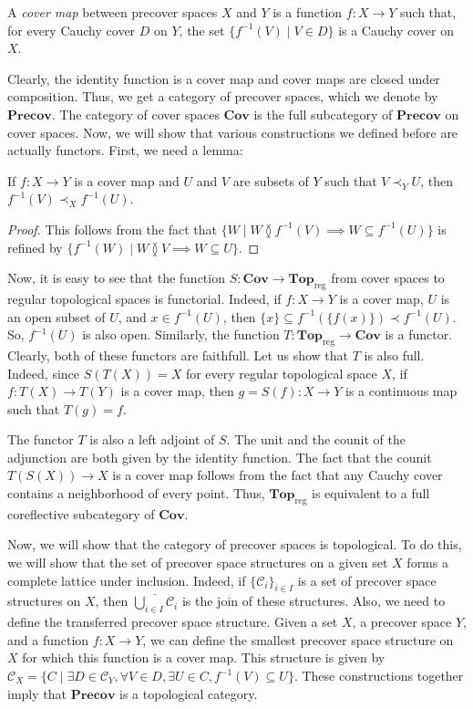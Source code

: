 \documentclass[reqno]{amsart}
\theoremstyle{definition}
\theoremstyle{remark}
\numberwithin{figure}{section}
\newcommand{\overlap}[2]{#1 \between #2}
\newcommand{\rb}{\prec}
\newcommand{\cat}[1]{\mathbf{#1}}
\begin{document}
\begin{defn}
A \emph{cover map} between precover spaces $X$ and $Y$ is a function $f : X \to Y$ such that, for every Cauchy cover $D$ on $Y$, the set $\{ f^{-1}(V) \mid V \in D \}$ is a Cauchy cover on $X$.
\end{defn}

Clearly, the identity function is a cover map and cover maps are closed under composition.
Thus, we get a category of precover spaces, which we denote by $\cat{Precov}$.
The category of cover spaces $\cat{Cov}$ is the full subcategory of $\cat{Precov}$ on cover spaces.
Now, we will show that various constructions we defined before are actually functors.
First, we need a lemma:

\begin{lem}
If $f : X \to Y$ is a cover map and $U$ and $V$ are subsets of $Y$ such that $V \rb_Y U$, then $f^{-1}(V) \rb_X f^{-1}(U)$.
\end{lem}
\begin{proof}
This follows from the fact that $\{ W \mid \overlap{W}{f^{-1}(V)} \implies W \subseteq f^{-1}(U) \}$ is refined by $\{ f^{-1}(W) \mid \overlap{W}{V} \implies W \subseteq U \}$.
\end{proof}

Now, it is easy to see that the function $S : \cat{Cov} \to \cat{Top}_\mathrm{reg}$ from cover spaces to regular topological spaces is functorial.
Indeed, if $f : X \to Y$ is a cover map, $U$ is an open subset of $U$, and $x \in f^{-1}(U)$, then $\{ x \} \subseteq f^{-1}(\{ f(x) \}) \rb f^{-1}(U)$.
So, $f^{-1}(U)$ is also open.
Similarly, the function $T : \cat{Top}_\mathrm{reg} \to \cat{Cov}$ is a functor.
Clearly, both of these functors are faithfull.
Let us show that $T$ is also full.
Indeed, since $S(T(X)) = X$ for every regular topological space $X$, if $f : T(X) \to T(Y)$ is a cover map, then $g = S(f) : X \to Y$ is a continuous map such that $T(g) = f$.

The functor $T$ is also a left adjoint of $S$.
The unit and the counit of the adjunction are both given by the identity function.
The fact that the counit $T(S(X)) \to X$ is a cover map follows from the fact that any Cauchy cover contains a neighborhood of every point.
Thus, $\cat{Top}_\mathrm{reg}$ is equivalent to a full coreflective subcategory of $\cat{Cov}$.

Now, we will show that the category of precover spaces is topological. %
To do this, we will show that the set of precover space structures on a given set $X$ forms a complete lattice under inclusion.
Indeed, if $\{ \mathcal{C}_i \}_{i \in I}$ is a set of precover space structures on $X$, then $\overline{\bigcup_{i \in I} \mathcal{C}_i}$ is the join of these structures.
Also, we need to define the transferred precover space structure.
Given a set $X$, a precover space $Y$, and a function $f : X \to Y$, we can define the smallest precover space structure on $X$ for which this function is a cover map.
This structure is given by $\mathcal{C}_X = \{ C \mid \exists D \in \mathcal{C}_Y, \forall V \in D, \exists U \in C, f^{-1}(V) \subseteq U \}$.
These constructions together imply that $\cat{Precov}$ is a topological category.
\end{document}
